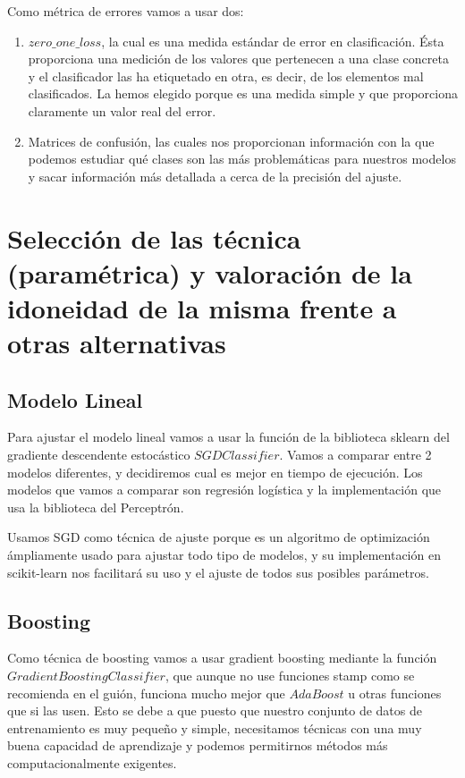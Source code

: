 \documentclass{article}
\begin{document}
	Como métrica de errores vamos a usar dos:
	\begin{enumerate}
		\item $zero\_one\_loss$, la cual es una medida estándar de error en clasificación. Ésta proporciona una medición de los valores que pertenecen a una clase concreta y el clasificador las ha etiquetado en otra, es decir, de los elementos mal clasificados. La hemos elegido porque es una medida simple y que proporciona claramente un valor real del error.
		\item Matrices de confusión, las cuales nos proporcionan información con la que podemos estudiar qué clases son las más problemáticas para nuestros modelos y sacar información más detallada a cerca de la precisión del ajuste.
	\end{enumerate}
	
	\section{Selección de las técnica (paramétrica) y valoración de la idoneidad de la misma frente a otras alternativas}
	
	\subsection{Modelo Lineal}
	Para ajustar el modelo lineal vamos a usar la función de la biblioteca sklearn del gradiente descendente estocástico $SGDClassifier$. Vamos a comparar entre 2 modelos diferentes, y decidiremos cual es mejor en tiempo de ejecución. Los modelos que vamos a comparar son regresión logística y la implementación que usa la biblioteca del Perceptrón.
	\par 
	Usamos SGD como técnica	de ajuste porque es un algoritmo de optimización ámpliamente usado para ajustar todo tipo de modelos, y su implementación en scikit-learn nos facilitará su uso y el ajuste de todos sus posibles parámetros. 
	\subsection{Boosting}
	Como técnica de boosting vamos a usar gradient boosting mediante la función $GradientBoostingClassifier$, que aunque no use funciones stamp como se recomienda en el guión, funciona mucho mejor que $AdaBoost$ u otras funciones que si las usen. Esto se debe a que puesto que nuestro conjunto de datos de entrenamiento es muy pequeño y simple, necesitamos técnicas con una muy buena capacidad de aprendizaje y podemos permitirnos métodos más computacionalmente exigentes. 
\end{document}
